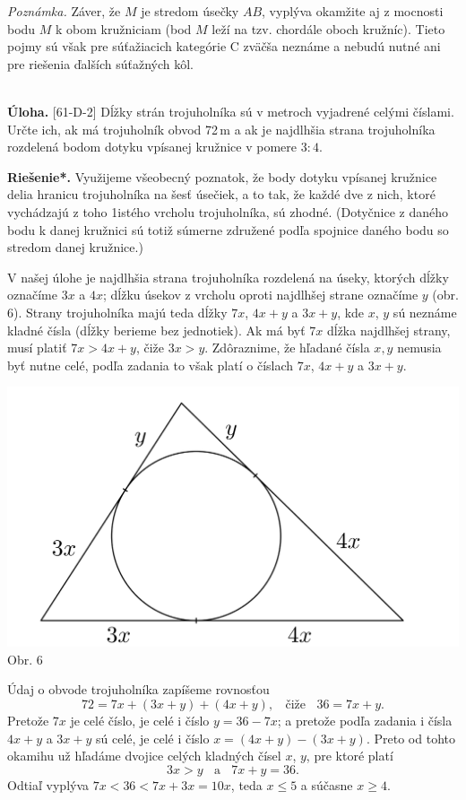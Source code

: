 \documentclass[11pt,a4paper,oneside,final]{book}
\newcommand{\ul}{\textbf{Úloha.} }
\newcommand{\rieh}{\textbf{Riešenie*.} }
\begin{document}
\textit{Poznámka.} Záver, že $M$ je stredom úsečky $AB$, vyplýva okamžite aj z mocnosti bodu $M$ k obom kružniciam (bod $M$ leží na tzv. chordále oboch kružníc). Tieto pojmy sú však pre súťažiacich kategórie C zväčša neznáme a nebudú nutné ani pre riešenia ďalších súťažných kôl.\\
\\
\begin{tcolorbox}[breakable,notitle,boxrule=0pt,colback=light-gray,colframe=light-gray]\ul [61-D-2] Dĺžky strán trojuholníka sú v metroch vyjadrené celými číslami. Určte ich, ak má trojuholník obvod 72\,m a ak je najdlhšia strana trojuholníka rozdelená bodom dotyku vpísanej kružnice v pomere $3 : 4.$

\end{tcolorbox}

\rieh Využijeme všeobecný poznatok, že body dotyku vpísanej kružnice delia hranicu trojuholníka na šesť úsečiek, a to tak, že každé dve z nich, ktoré vychádzajú z toho 1istého vrcholu trojuholníka, sú zhodné. (Dotyčnice z daného bodu k danej kružnici sú totiž súmerne združené podľa spojnice daného bodu so stredom danej kružnice.)

V našej úlohe je najdlhšia strana trojuholníka rozdelená na úseky, ktorých dĺžky označíme $3x$ a $4x$; dĺžku úsekov z vrcholu oproti najdlhšej strane označíme $y$ (obr. 6). Strany trojuholníka majú teda dĺžky $7x$, $4x + y$ a $3x + y$, kde $x$, $y$ sú neznáme kladné čísla (dĺžky berieme bez jednotiek). Ak má byť $7x$ dĺžka najdlhšej strany, musí platiť $7x > 4x + y$, čiže $3x > y$. Zdôraznime, že hľadané čísla $x, y$ nemusia byť nutne celé, podľa zadania to však platí o číslach $7x$, $4x + y$ a $3x + y$.
\begin{center}
\includegraphics[scale=0.3]{61D1}\\

Obr. 6
\end{center}
Údaj o obvode trojuholníka zapíšeme rovnosťou
$$72 = 7x + (3x + y) + (4x + y), \ \ \ \ \text{čiže} \ \ \ \ 36 = 7x + y.$$
Pretože $7x$ je celé číslo, je celé i číslo $y = 36 - 7x$; a pretože podľa zadania i čísla $4x + y$ a $3x + y$ sú celé, je celé i číslo $x = (4x + y) - (3x + y)$. Preto od tohto okamihu už hľadáme dvojice celých kladných čísel $x$, $y$, pre ktoré platí
$$3x > y \ \ \ \ \text{a}  \ \ \ \ 7x + y = 36.$$
Odtiaľ vyplýva $7x < 36 < 7x + 3x = 10x$, teda $x \leq 5$ a súčasne $x \geq 4$.
\end{document}
